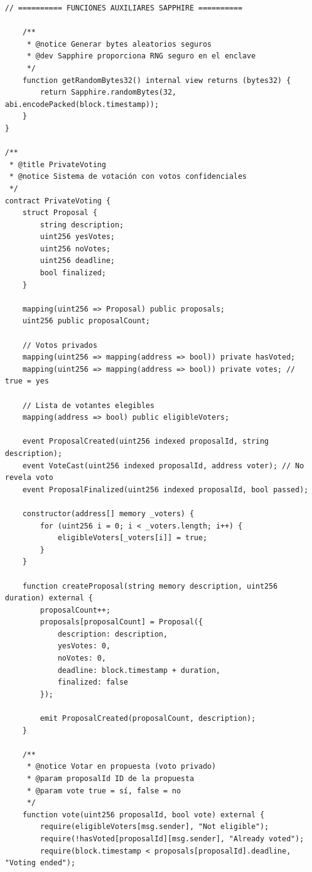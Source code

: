 \documentclass[11pt,a4paper,twoside]{book}
\theoremstyle{definition}
\theoremstyle{remark}
\begin{document}
\begin{lstlisting}[language=Solidity, caption={Contrato confidencial en Oasis Sapphire}]
    // ========== FUNCIONES AUXILIARES SAPPHIRE ==========
    
    /**
     * @notice Generar bytes aleatorios seguros
     * @dev Sapphire proporciona RNG seguro en el enclave
     */
    function getRandomBytes32() internal view returns (bytes32) {
        return Sapphire.randomBytes(32, abi.encodePacked(block.timestamp));
    }
}

/**
 * @title PrivateVoting
 * @notice Sistema de votación con votos confidenciales
 */
contract PrivateVoting {
    struct Proposal {
        string description;
        uint256 yesVotes;
        uint256 noVotes;
        uint256 deadline;
        bool finalized;
    }
    
    mapping(uint256 => Proposal) public proposals;
    uint256 public proposalCount;
    
    // Votos privados
    mapping(uint256 => mapping(address => bool)) private hasVoted;
    mapping(uint256 => mapping(address => bool)) private votes; // true = yes
    
    // Lista de votantes elegibles
    mapping(address => bool) public eligibleVoters;
    
    event ProposalCreated(uint256 indexed proposalId, string description);
    event VoteCast(uint256 indexed proposalId, address voter); // No revela voto
    event ProposalFinalized(uint256 indexed proposalId, bool passed);
    
    constructor(address[] memory _voters) {
        for (uint256 i = 0; i < _voters.length; i++) {
            eligibleVoters[_voters[i]] = true;
        }
    }
    
    function createProposal(string memory description, uint256 duration) external {
        proposalCount++;
        proposals[proposalCount] = Proposal({
            description: description,
            yesVotes: 0,
            noVotes: 0,
            deadline: block.timestamp + duration,
            finalized: false
        });
        
        emit ProposalCreated(proposalCount, description);
    }
    
    /**
     * @notice Votar en propuesta (voto privado)
     * @param proposalId ID de la propuesta
     * @param vote true = sí, false = no
     */
    function vote(uint256 proposalId, bool vote) external {
        require(eligibleVoters[msg.sender], "Not eligible");
        require(!hasVoted[proposalId][msg.sender], "Already voted");
        require(block.timestamp < proposals[proposalId].deadline, "Voting ended");
        

\end{lstlisting}
\end{document}
